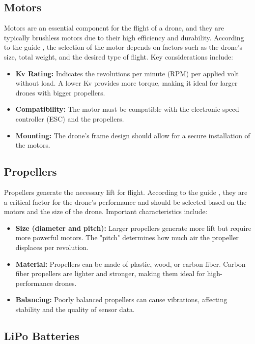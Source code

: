 \subsection{Motors}

Motors are an essential component for the flight of a drone, and they are typically brushless motors due to their high efficiency and durability. According to the guide \cite{ardupilot}, the selection of the motor depends on factors such as the drone's size, total weight, and the desired type of flight. Key considerations include:

\begin{itemize}
    \item \textbf{Kv Rating:} Indicates the revolutions per minute (RPM) per applied volt without load. A lower Kv provides more torque, making it ideal for larger drones with bigger propellers.
    \item \textbf{Compatibility:} The motor must be compatible with the electronic speed controller (ESC) and the propellers.
    \item \textbf{Mounting:} The drone's frame design should allow for a secure installation of the motors.
\end{itemize}

\subsection{Propellers}

Propellers generate the necessary lift for flight. According to the guide \cite{ardupilot}, they are a critical factor for the drone's performance and should be selected based on the motors and the size of the drone. Important characteristics include:

\begin{itemize}
    \item \textbf{Size (diameter and pitch):} Larger propellers generate more lift but require more powerful motors. The "pitch" determines how much air the propeller displaces per revolution.
    \item \textbf{Material:} Propellers can be made of plastic, wood, or carbon fiber. Carbon fiber propellers are lighter and stronger, making them ideal for high-performance drones.
    \item \textbf{Balancing:} Poorly balanced propellers can cause vibrations, affecting stability and the quality of sensor data.
\end{itemize}

\subsection{LiPo Batteries}

